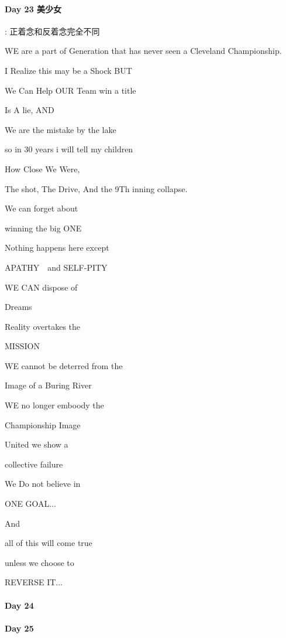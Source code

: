 \documentclass[UTF8,a4paper,8pt]{ctexbook}
\begin{document}
 	 \paragraph{Day 23   美少女   \quad     }:
 	    正着念和反着念完全不同
 	    
	 	 WE are a part of Generation that has never seen a Cleveland Championship.
	 	 
	 	 I  Realize this may be a Shock BUT
	 	 
	 	 We Can  Help OUR Team win a title
	 	 
	 	 Is A lie, AND
	 	 
	 	 We are  the mistake  by the lake
	 	 
	 	 so in 30 years i will tell my children
	 	 
	 	 How Close We Were,
	 	 
	 	 The shot, The Drive, And the 9Th inning collapse.
	 	 
	 	 We can forget about 
	 	 
	 	 winning the big ONE
	 	 
	 	 Nothing happens here except
	 	 
	 	 APATHY　and SELF-PITY
	 	 
	 	 WE CAN  dispose of
	 	 
	 	 Dreams
	 	 
	 	 Reality  overtakes the
	 	 
	 	 MISSION
	 	 
	 	 WE cannot be deterred from the
	 	 
	 	 Image of a Buring River
	 	 
	 	 WE no longer emboody the 
	 	 
	 	 Championship Image
	 	 
	 	 United we show a 
	 	 
	 	 collective failure
	 	 
	 	 We Do not believe in
	 	 
	 	 ONE GOAL...
	 	 
	 	 And 
	 	 
	 	 all of this will come true
	 	 
	 	 unless we choose to
	 	 
	 	 REVERSE IT...
 	 \paragraph{Day 24      \quad     }
 	 \paragraph{Day 25      \quad     }
\end{document}
